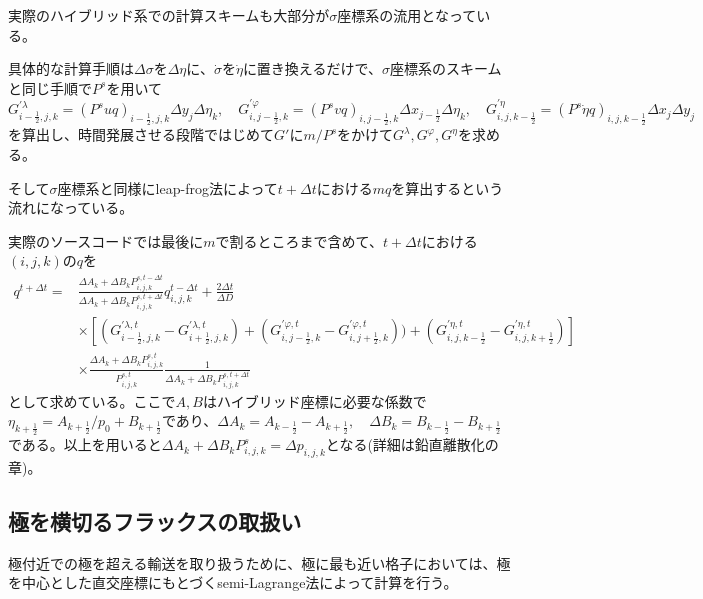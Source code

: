 \documentclass{jsbook}
\begin{document}
実際のハイブリッド系での計算スキームも大部分が$\sigma$座標系の流用となっている。

具体的な計算手順は$\Delta \sigma$を$\Delta \eta$に、$\dot{\sigma}$を$\dot{\eta}$に置き換えるだけで、$\sigma$座標系のスキームと同じ手順で$P^{s}$を用いて
\begin{equation}
  G^{\prime \lambda}_{i-\frac{1}{2},j,k}=(P^{s}uq)_{i-\frac{1}{2},j,k} \Delta y_{j} \Delta \eta_{k},\quad G^{\prime \varphi}_{i,j-\frac{1}{2},k}=(P^{s}vq)_{i,j-\frac{1}{2},k} \Delta x_{j-\frac{1}{2}} \Delta \eta_{k},\quad G^{\prime \eta}_{i,j,k-\frac{1}{2}}=(P^{s} \dot{\eta} q)_{i,j,k-\frac{1}{2}} \Delta x_{j} \Delta y_{j}
\end{equation}
を算出し、時間発展させる段階ではじめて$G\prime$に$m/P^{s}$をかけて$G^{\lambda}, G^{\varphi}, G^{\eta}$を求める。

そして$\sigma$座標系と同様にleap-frog法によって$t+\Delta t$における$mq$を算出するという流れになっている。

実際のソースコードでは最後に$m$で割るところまで含めて、$t+\Delta t$における$(i,j,k)$の$q$を
\begin{equation}
  \begin{split}
        q^{t+\Delta t}=&\frac{\Delta A_{k}+\Delta B_{k} P^{s,t-\Delta t}_{i,j,k}}{\Delta A_{k}+\Delta B_{k} P^{s,t+\Delta t}_{i,j,k}}q^{t-\Delta t}_{i,j,k}+\frac{2\Delta t}{\Delta D}\\
    &\times [(G^{\prime \lambda,t}_{i-\frac{1}{2},j,k}-G^{\prime \lambda,t}_{i+\frac{1}{2},j,k})+(G^{\prime \varphi,t}_{i,j-\frac{1}{2},k}-G^{\prime \varphi,t}_{i,j+\frac{1}{2},k}))+(G^{\prime \eta,t}_{i,j,k-\frac{1}{2}}-G^{\prime \eta,t}_{i,j,k+\frac{1}{2}})]\\
    &\times \frac{\Delta A_{k}+\Delta B_{k} P^{s,t}_{i,j,k}}{P^{s,t}_{i,j,k}}\frac{1}{\Delta A_{k}+\Delta B_{k} P^{s,t+\Delta t}_{i,j,k}}
  \end{split}
\end{equation}
として求めている。ここで$A,B$はハイブリッド座標に必要な係数で$\eta_{k+\frac{1}{2}}=A_{k+\frac{1}{2}}/p_{0}+B_{k+\frac{1}{2}}$であり、$\Delta A_{k}=A_{k-\frac{1}{2}}-A_{k+\frac{1}{2}},\quad \Delta B_{k}=B_{k-\frac{1}{2}}-B_{k+\frac{1}{2}}$である。以上を用いると$\Delta A_{k}+\Delta B_{k} P^{s}_{i,j,k}=\Delta p_{i,j,k}$となる(詳細は鉛直離散化の章)。

\subsection{極を横切るフラックスの取扱い}
極付近での極を超える輸送を取り扱うために、極に最も近い格子においては、極を中心とした直交座標にもとづくsemi-Lagrange法によって計算を行う。
\end{document}

